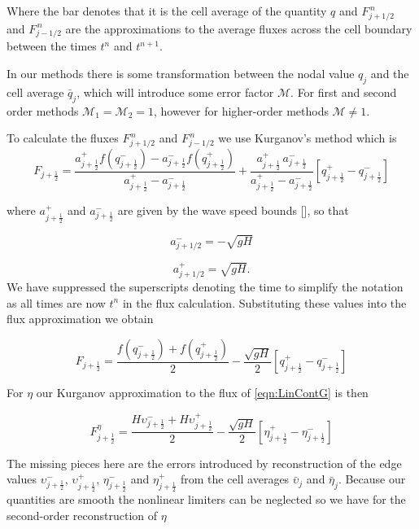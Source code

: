 Where the bar denotes that it is the cell average of the quantity $q$ and $F^{\,n} _{j+1/2}$ and $F^{\,n} _{j-1/2}$ are the approximations to the average fluxes across the cell boundary between the times $t^n$ and $t^{n+1}$. 

In our methods there is some transformation between the nodal value $q_j$ and the cell average $\bar{q}_j$, which will introduce some error factor $\mathcal{M}$. For first and second order methods $\mathcal{M}_1 = \mathcal{M}_2 = 1$, however for higher-order methods $\mathcal{M} \neq 1$.

To calculate the fluxes $F^{\,n} _{j+1/2}$ and $F^{\,n} _{j-1/2}$ we use Kurganov's method \cite{Kurganov-etal-2001-707} which is 
\begin{equation*}
F_{j+\frac{1}{2}} = \dfrac{a^+_{j+\frac{1}{2}} f\left(q^-_{j+\frac{1}{2}}\right) - a^-_{j+\frac{1}{2}} f\left(q^+_{j+\frac{1}{2}}\right)}{a^+_{j+\frac{1}{2}} - a^-_{j+\frac{1}{2}}}  + \dfrac{a^+_{j+\frac{1}{2}} \, a^-_{j+\frac{1}{2}}}{a^+_{j+\frac{1}{2}} - a^-_{j+\frac{1}{2}}} \left [ q^+_{j+\frac{1}{2}} - q^-_{j+\frac{1}{2}} \right ]
\end{equation*}

where $a^+_{j+\frac{1}{2}}$ and $a^-_{j+\frac{1}{2}}$ are given by the wave speed bounds [], so that 

\[a^-_{j+ 1/2} =  - \sqrt{g H}\]

\[a^+_{j+ 1/2} = \sqrt{g H}.\]
We have suppressed the superscripts denoting the time to simplify the notation as all times are now $t^n$ in the flux calculation. Substituting these values into the flux approximation we obtain 

\begin{equation}\label{eqn:HLL_fluxred}
F_{j+\frac{1}{2}} = \dfrac{ f\left(q^-_{j+\frac{1}{2}}\right) + f\left(q^+_{j+\frac{1}{2}}\right)}{ 2}  - \dfrac{ \sqrt{gH}}{ 2} \left [ q^+_{j+\frac{1}{2}} - q^-_{j+\frac{1}{2}} \right ]
\end{equation}

For $\eta$ our Kurganov approximation to the flux of \eqref{eqn:LinContG} is then

\begin{equation}
\label{eqn:HLL_fluxeta}
F^{\eta}_{j+\frac{1}{2}} = \dfrac{ H \upsilon ^-_{j+\frac{1}{2}}+ H \upsilon ^+_{j+\frac{1}{2}}}{ 2}  - \dfrac{ \sqrt{gH}}{ 2} \left [ \eta^+_{j+\frac{1}{2}} - \eta^-_{j+\frac{1}{2}} \right ]
\end{equation}

The missing pieces here are the errors introduced by reconstruction of the edge values $\upsilon ^-_{j+\frac{1}{2}}$, $\upsilon ^+_{j+\frac{1}{2}}$, $\eta ^-_{j+\frac{1}{2}}$ and $\eta ^+_{j+\frac{1}{2}}$ from the cell averages $\bar{\upsilon}_j$ and $\bar{\eta}_j$. Because our quantities are smooth the nonlinear limiters can be neglected so we have for the second-order reconstruction of $\eta$ 

